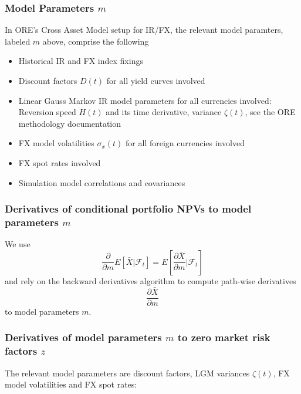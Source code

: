 \documentclass[11pt,a4paper,oneside]{article}
\begin{document}
\subsubsection*{Model Parameters $m$}

In ORE's Cross Asset Model setup for IR/FX, the relevant model paramters, labeled $m$ above, comprise the following
\begin{itemize}
\item Historical IR and FX index fixings
\item Discount factors $D(t)$ for all yield curves involved
\item Linear Gauss Markov IR model parameters for all currencies involved: Reversion speed $H(t)$ and its time derivative,
  variance $\zeta(t)$, see the ORE methodology documentation 
\item FX model volatilities $\sigma_x(t)$ for all foreign currencies involved
\item FX spot rates involved
\item Simulation model correlations and covariances
\end{itemize}

\subsubsection*{Derivatives of conditional portfolio NPVs to model parameters $m$}

We use
$$
\frac{\partial}{\partial m} E\left[ \bar{X} \bigg| \mathcal{F}_t \right] = E\left[ \frac{\partial \bar{X}}{\partial m} \bigg| \mathcal{F}_t \right]
$$
and rely on the backward derivatives algorithm to compute path-wise derivatives
$$
\frac{\partial \bar{X}}{\partial m}
$$
to model parameters $m$.

\subsubsection*{Derivatives of model parameters $m$ to zero market risk factors $z$}

The relevant model parameters are discount factors, LGM variances $\zeta(t)$, FX model volatilities and
FX spot rates:
\end{document}
